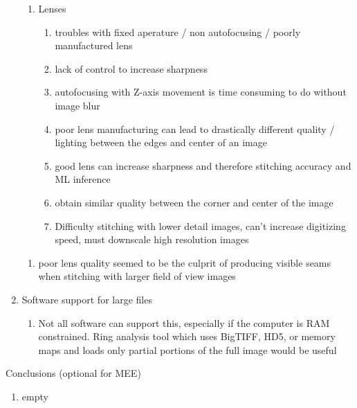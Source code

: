 \documentclass{article}
\begin{document}
\begin{outline}[enumerate]
\begin{enumerate}
\begin{enumerate}
			\item Lenses
			\begin{enumerate}
				\item troubles with fixed aperature / non autofocusing / poorly manufactured lens
				\item lack of control to increase sharpness
				\item autofocusing with Z-axis movement is time consuming to do without image blur
				\item poor lens manufacturing can lead to drastically different quality / lighting between the edges and center of an image
				\item good lens can increase sharpness and therefore stitching accuracy and ML inference
				\item obtain similar quality between the corner and center of the image
				\item Difficulty stitching with lower detail images, can't increase digitizing speed, must downscale high resolution images 
				\end{enumerate}
		\end{enumerate}
		\begin{enumerate}
		\item poor lens quality seemed to be the culprit of producing visible seams when stitching with larger field of view images 
		\end{enumerate}

	\item Software support for large files 
		\begin{enumerate}
		\item Not all software can support this, especially if the computer is RAM constrained. Ring analysis tool which uses BigTIFF, HD5, or memory maps and loads only partial portions of the full image would be useful
		\end{enumerate}
	\end{enumerate}
\item Conclusions (optional for MEE) %
	\begin{enumerate}
	\item empty
	\end{enumerate}
        
\end{outline}
\end{document}
